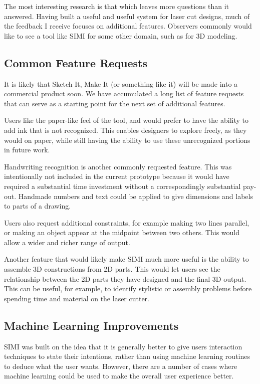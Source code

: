The most interesting research is that which leaves more questions than
it answered. Having built a useful and useful system for laser cut
designs, much of the feedback I receive focuses on additional
features. Observers commonly would like to see a tool like SIMI for
some other domain, such as for 3D modeling.

\subsection{Common Feature Requests}

It is likely that Sketch It, Make It (or something like it) will be
made into a commercial product soon. We have accumulated a long list of feature
requests that can serve as a starting point for the next set of
additional features. 

Users like the paper-like feel of the tool, and would prefer to have
the ability to add ink that is not recognized. This enables designers
to explore freely, as they would on paper, while still having the
ability to use these unrecognized portions in future work.

Handwriting recognition is another commonly requested feature. This
was intentionally not included in the current prototype because it
would have required a substantial time investment without a
correspondingly substantial pay-out. Handmade numbers and text could be
applied to give dimensions and labels to parts of a drawing.

Users also request additional constraints, for example making two
lines parallel, or making an object appear at the midpoint between two
others. This would allow a wider and richer range of output.

Another feature that would likely make SIMI much more useful is the
ability to assemble 3D constructions from 2D parts. This would let
users see the relationship between the 2D parts they have designed and
the final 3D output. This can be useful, for example, to identify
stylistic or assembly problems before spending time and material on
the laser cutter.

\subsection{Machine Learning Improvements}

SIMI was built on the idea that it is generally better to give users
interaction techniques to state their intentions, rather than using
machine learning routines to deduce what the user wants. However,
there are a number of cases where machine learning could be used to
make the overall user experience better.

